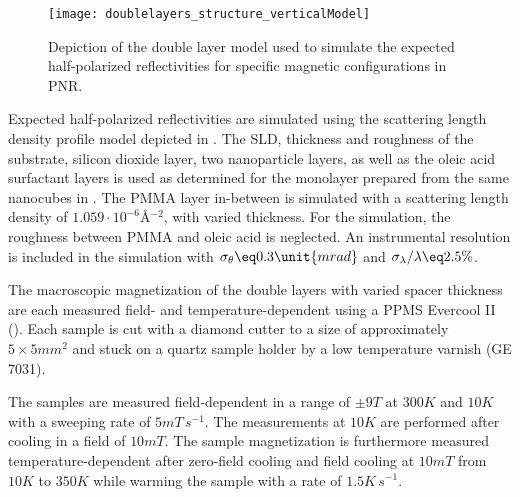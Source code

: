 \documentclass[\main/dresen_thesis.tex]{subfiles}
\begin{document}
    \begin{figure}[tb]
      \centering
      \texttt{[image: doublelayers\_structure\_verticalModel]}
      \caption{\label{fig:doubleLayers:characterization:doublelayerModel}Depiction of the double layer model used to simulate the expected half-polarized reflectivities for specific magnetic configurations in PNR.}
    \end{figure}
    Expected half-polarized reflectivities are simulated using the scattering length density profile model depicted in .
    The SLD, thickness and roughness of the substrate, silicon dioxide layer, two nanoparticle layers, as well as the oleic acid surfactant layers is used as determined for the monolayer prepared from the same nanocubes in .
    The PMMA layer in-between is simulated with a scattering length density of $1.059 \cdot \unit{10^{-6} \angstrom^{-2}}$, with varied thickness.
    For the simulation, the roughness between PMMA and oleic acid is neglected.
    An instrumental resolution is included in the simulation with $\sigma_\theta \eq 0.3 \unit{mrad}$ and $\sigma_\lambda / \lambda \eq 2.5 \%$.
    
    The macroscopic magnetization of the double layers with varied spacer thickness are each measured field- and temperature-dependent using a PPMS Evercool II ().
    Each sample is cut with a diamond cutter to a size of approximately $5 \times 5 \unit{mm^2}$ and stuck on a quartz sample holder by a low temperature varnish (GE 7031).

    The samples are measured field-dependent in a range of $\pm 9 \unit{T}$ at $300 \unit{K}$ and $10 \unit{K}$ with a sweeping rate of $5 \unit{mT \, s^{-1}}$.
    The measurements at $10 \unit{K}$ are performed after cooling in a field of $10 \unit{mT}$.
    The sample magnetization is furthermore measured temperature-dependent after zero-field cooling and field cooling at $10 \unit{mT}$ from $10 \unit{K}$ to $350 \unit{K}$ while warming the sample with a rate of $1.5 \unit{K \, s^{-1}}$.
\end{document}
